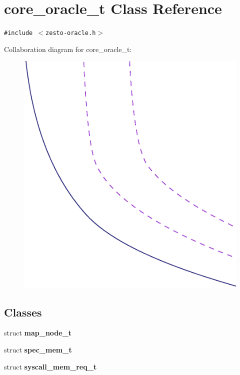 \section{core\_\-oracle\_\-t Class Reference}
\label{classcore__oracle__t}
{\tt \#include $<$zesto-oracle.h$>$}

Collaboration diagram for core\_\-oracle\_\-t:\nopagebreak
\begin{figure}[H]
\begin{center}
\leavevmode
\includegraphics[width=400pt]{classcore__oracle__t__coll__graph}
\end{center}
\end{figure}
\subsection*{Classes}
\begin{CompactItemize}
\item 
struct {\bf map\_\-node\_\-t}
\item 
struct {\bf spec\_\-mem\_\-t}
\item 
struct {\bf syscall\_\-mem\_\-req\_\-t}
\end{CompactItemize}

